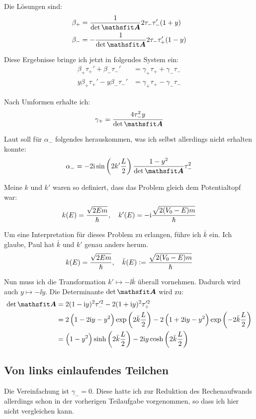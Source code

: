 Die Lösungen sind:
\begin{align*}
	\beta_+ &= \frac1\detA 2 \tau_- \tau_-' (1+y) \\
	\beta_- &= - \frac1\detA 2 \tau_- \tau_+' (1-y) \\
\end{align*}

Diese Ergebnisse bringe ich jetzt in folgendes System ein:
\begin{align*}
	\beta_+ \tau_+' + \beta_- \tau_-'
	&= \gamma_+ \tau_+ + \gamma_- \tau_- \\
	y\beta_+ \tau_+' - y\beta_- \tau_-'
	&= \gamma_+ \tau_+ - \gamma_- \tau_-
\end{align*}

Nach Umformen erhalte ich:
\[
	\gamma_+ = \frac{4 \tau_-^2 y}\detA
\]

Laut \cite[Seite 270]{nolting-theo5} soll für $\alpha_-$ folgendes
herauskommen, was ich selbst allerdings nicht erhalten konnte:
\[
	\alpha_- = - 2 \ii \sin\del{2 k' \frac L2} \frac{1-y^2}\detA \tau_-^2
\]

Meine $k$ und $k'$ waren so definiert, dass das Problem gleich dem
Potentialtopf war:
\[
	k(E) = \frac{\sqrt{2Em}}\hbar
	,\quad
	k'(E) = - \mathrm i \frac{\sqrt{2(V_0-E)m}}\hbar
\]

Um eine Interpretation für dieses Problem zu erlangen, führe ich $\bar k$ ein.
Ich glaube, Paul hat $\bar k$ und $k'$ genau anders herum.
\[
	k(E) = \frac{\sqrt{2Em}}\hbar
	,\quad
	\bar k(E) := \frac{\sqrt{2(V_0-E)m}}\hbar
\]

Nun muss ich die Transformation $k' \mapsto - \ii \bar k$ überall vornehmen.
Dadurch wird auch $y \mapsto -\ii y$. Die Determinante $\detA$ wird zu:
\begin{align*}
	\detA
	&= 2 (1-\ii y)^2 \tau_-^{\prime2} - 2(1+\ii y)^2 \tau_+^{\prime2} \\
	&= 2 \del{1 - 2\ii y - y^2} \exp\del{2 \bar k \frac L2} - 2 \del{1 + 2\ii y - y^2} \exp\del{- 2 \bar k \frac L2} \\
	&= \del{1-y^2} \sinh\del{2 \bar k \frac L2} - 2 \ii y \cosh\del{2 \bar k \frac L2}
\end{align*}

\subsection{Von links einlaufendes Teilchen}

Die Vereinfachung ist $\gamma_- = 0$. Diese hatte ich zur Reduktion des
Rechenaufwands allerdings schon in der vorherigen Teilaufgabe vorgenommen, so
dass ich hier nicht vergleichen kann.


